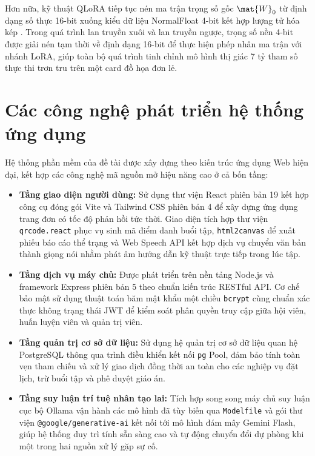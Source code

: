 Hơn nữa, kỹ thuật QLoRA tiếp tục nén ma trận trọng số gốc $\mat{W}_0$ từ định dạng số thực 16-bit xuống kiểu dữ liệu NormalFloat 4-bit kết hợp lượng tử hóa kép \cite{dettmers2023qlora}. Trong quá trình lan truyền xuôi và lan truyền ngược, trọng số nền 4-bit được giải nén tạm thời về định dạng 16-bit để thực hiện phép nhân ma trận với nhánh LoRA, giúp toàn bộ quá trình tinh chỉnh mô hình thị giác 7 tỷ tham số thực thi trơn tru trên một card đồ họa đơn lẻ.

\section{Các công nghệ phát triển hệ thống ứng dụng}
\label{sec:congnghe}

Hệ thống phần mềm của đề tài được xây dựng theo kiến trúc ứng dụng Web hiện đại, kết hợp các công nghệ mã nguồn mở hiệu năng cao ở cả bốn tầng:
\begin{itemize}[leftmargin=1.5cm]
    \item \textbf{Tầng giao diện người dùng:} Sử dụng thư viện React phiên bản 19 kết hợp công cụ đóng gói Vite và Tailwind CSS phiên bản 4 để xây dựng ứng dụng trang đơn có tốc độ phản hồi tức thời. Giao diện tích hợp thư viện \texttt{qrcode.react} phục vụ sinh mã điểm danh buổi tập, \texttt{html2canvas} để xuất phiếu báo cáo thể trạng và Web Speech API kết hợp dịch vụ chuyển văn bản thành giọng nói nhằm phát âm hướng dẫn kỹ thuật trực tiếp trong lúc tập.
    \item \textbf{Tầng dịch vụ máy chủ:} Được phát triển trên nền tảng Node.js và framework Express phiên bản 5 theo chuẩn kiến trúc RESTful API. Cơ chế bảo mật sử dụng thuật toán băm mật khẩu một chiều \texttt{bcrypt} cùng chuẩn xác thực không trạng thái JWT để kiểm soát phân quyền truy cập giữa hội viên, huấn luyện viên và quản trị viên.
    \item \textbf{Tầng quản trị cơ sở dữ liệu:} Sử dụng hệ quản trị cơ sở dữ liệu quan hệ PostgreSQL \cite{postgresql2026docs} thông qua trình điều khiển kết nối \texttt{pg} Pool, đảm bảo tính toàn vẹn tham chiếu và xử lý giao dịch đồng thời an toàn cho các nghiệp vụ đặt lịch, trừ buổi tập và phê duyệt giáo án.
    \item \textbf{Tầng suy luận trí tuệ nhân tạo lai:} Tích hợp song song máy chủ suy luận cục bộ Ollama \cite{ollama2026docs} vận hành các mô hình đã tùy biến qua \texttt{Modelfile} và gói thư viện \texttt{@google/generative-ai} kết nối tới mô hình đám mây Gemini Flash, giúp hệ thống duy trì tính sẵn sàng cao và tự động chuyển đổi dự phòng khi một trong hai nguồn xử lý gặp sự cố.
\end{itemize}
